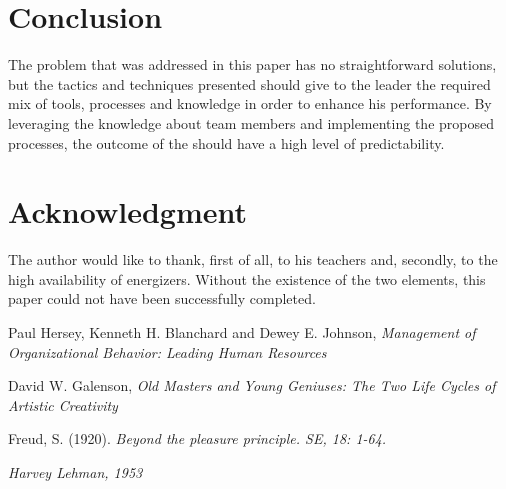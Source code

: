 \documentclass[conference]{IEEEtran}
\begin{document}
\section{Conclusion}
The problem that was addressed in this paper has no straightforward solutions, but the tactics and techniques presented should give to the leader the required mix of tools, processes and knowledge in order to enhance his performance. By leveraging the knowledge about team members and implementing the proposed processes, the outcome of the should have a high level of predictability.  

\section*{Acknowledgment}
The author would like to thank, first of all, to his teachers and, secondly, to the high availability of energizers. Without the existence of the two elements, this paper could not have been successfully completed. 




\newpage
\begin{thebibliography}{99}


Paul Hersey, Kenneth H. Blanchard and Dewey E. Johnson, \emph{Management of Organizational Behavior: Leading Human Resources}

David W. Galenson, \emph{Old Masters and Young Geniuses: The Two Life Cycles of Artistic Creativity}

Freud, S. (1920). \emph{Beyond the pleasure principle. SE, 18: 1-64.}

\emph{Harvey Lehman, 1953} 

\end{thebibliography}
\end{document}

